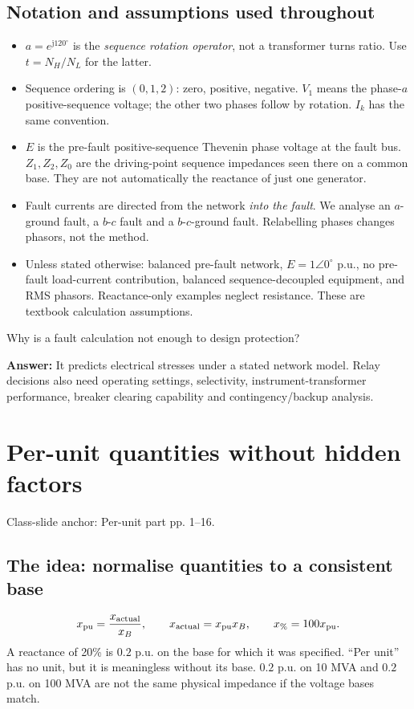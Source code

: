 \documentclass[11pt,a4paper]{article}
\newcommand{\slides}[1]{{\small\color{muted}\textsf{Class-slide anchor: #1.}}\par}
\newcommand{\chapterstart}[2]{\clearpage\section{#1}\label{#2}}
\newcommand{\checkq}[2]{\begin{tcolorbox}[breakable=false,colback=pale,colframe=teal,coltitle=white,title={Check your understanding}]#1\par\textbf{Answer:} #2\end{tcolorbox}}
\newcommand{\jj}{\mathrm j}
\begin{document}
\Needspace{95mm}
\subsection{Notation and assumptions used throughout}
\begin{itemize}
\item $a=e^{\jj120^\circ}$ is the \emph{sequence rotation operator}, not a transformer turns ratio. Use $t=N_H/N_L$ for the latter.
\item Sequence ordering is $(0,1,2)$: zero, positive, negative. $V_1$ means the phase-$a$ positive-sequence voltage; the other two phases follow by rotation. $I_k$ has the same convention.
\item $E$ is the pre-fault positive-sequence Thevenin phase voltage at the fault bus. $Z_1,Z_2,Z_0$ are the driving-point sequence impedances seen there on a common base. They are not automatically the reactance of just one generator.
\item Fault currents are directed from the network \emph{into the fault}. We analyse an $a$-ground fault, a $b$-$c$ fault and a $b$-$c$-ground fault. Relabelling phases changes phasors, not the method.
\item Unless stated otherwise: balanced pre-fault network, $E=1\angle0^\circ$ p.u., no pre-fault load-current contribution, balanced sequence-decoupled equipment, and RMS phasors. Reactance-only examples neglect resistance. These are textbook calculation assumptions.
\end{itemize}
\checkq{Why is a fault calculation not enough to design protection?}{It predicts electrical stresses under a stated network model. Relay decisions also need operating settings, selectivity, instrument-transformer performance, breaker clearing capability and contingency/backup analysis.}

\chapterstart{Per-unit quantities without hidden factors}{pu}
\slides{Per-unit part pp. 1--16}
\subsection{The idea: normalise quantities to a consistent base}
\[
 x_{\rm pu}=\frac{x_{\rm actual}}{x_B},\qquad x_{\rm actual}=x_{\rm pu}x_B,\qquad x_{\%}=100x_{\rm pu}.
\]
A reactance of 20\% is $0.2$ p.u. on the base for which it was specified. ``Per unit'' has no unit, but it is meaningless without its base. $0.2$ p.u. on 10 MVA and $0.2$ p.u. on 100 MVA are not the same physical impedance if the voltage bases match.
\end{document}
